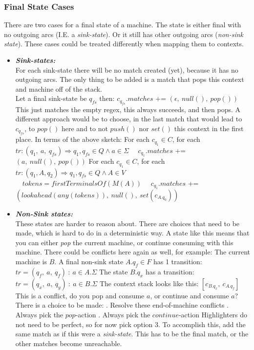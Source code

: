 	\subsubsection{Final State Cases} \label{sec:FinalStateCases}	
	There are two cases for a final state of a machine. The state is either final with no outgoing arcs (I.E. a \textit{sink-state}). Or it still has other outgoing arcs (\textit{non-sink state}). These cases could be treated differently when mapping them to contexts.
	\begin{itemize}
		\item \emph{\textbf{Sink-states:}}\\
		For each sink-state there will be no match created (yet), because it has no outgoing arcs. The only thing to be added is a match that pops this context and machine off of the stack.\\
		Let a final sink-state be $q_{fs}$ then:
			\subitem $c_{q_{fs}}.matches$ += $(\epsilon,\ null(),\ pop())$\vspace{0.05in}\\
			This just matches the empty regex, this always succeeds, and then pops. A different approach would be to choose, in the last match that would lead to $c_{q_{fs}}$, to $pop()$ here and to not $push()$ nor $set()$ this context in the first place. In terms of the above sketch:
			\subitem For each $c_{q_1} \in C$, for each $tr:(q_1,\ a,\ q_{fs}) \Rightarrow q_1, q_{fs} \in Q \land a \in \Sigma$
				\subsubitem $\quad c_{q_1}.matches$ += $(a,\ null(),\ pop())$
			\subitem For each $c_{q_1} \in C$, for each $tr:(q_1, A, q_2) \Rightarrow q_1, q_{fs} \in Q \land A \in V$
				\subsubitem $\quad tokens = firstTerminalsOf(M(A))$
				\subsubitem $\quad c_{q_1}.matches$ += $(lookahead(any(tokens)),\ null(),\ set(c_{A.q_0}))$
		\item \emph{\textbf{Non-Sink states:}}\\
		These states are harder to reason about. There are choices that need to be made, which is hard to do in a deterministic way. A state like this means that you can either \emph{pop} the current machine, or continue consuming with this machine. There could be conflicts here again as well, for example:
		\subitem The current machine is $B$.
		\subitem A final non-sink state $A.q_f \in F$ has 1 transition: $tr=(q_f,\ a,\ q_f)\ :\ a \in A.\Sigma$
		\subitem The state $B.q_x$ has a transition: $tr=(q_x,\ a,\ q_y)\ :\ a \in B.\Sigma$			
		\subitem The context stack looks like this: $[c_{B.q_x},\ c_{A.q_f}]$
		\subitem This is a conflict, do you pop and consume $a$, or continue and consume $a$?
		\subitem There is a choice to be made:
			. Resolve these end-of-machine conflicts
			. Always pick the $pop$-action
			. Always pick the $continue$-action
		\subitem Highlighters do not need to be perfect, so for now pick option 3.
		\subitem To accomplish this, add the same match as if this were a \textit{sink-state}.
		\subitem This has to be the final match, or the other matches become unreachable.
	\end{itemize}
	\pagebreak
	
